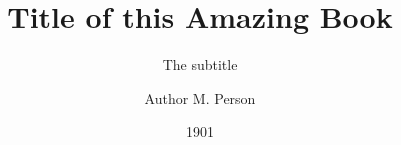 
\title[Shorter Title]{Title of this Amazing Book}
\subtitle{The subtitle}
\author{Author M. Person}
\date{1901}

